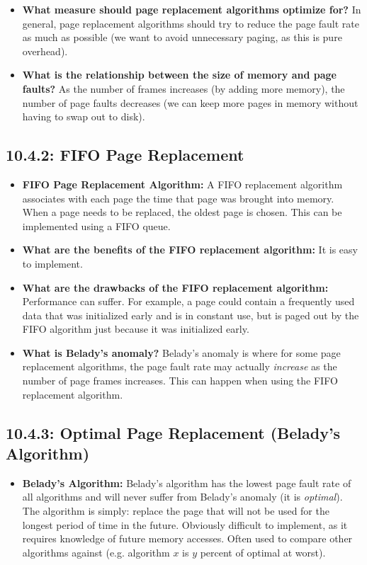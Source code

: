 \documentclass[12pt]{article}
\begin{document}
\begin{itemize}
    \item \textbf{What measure should page replacement algorithms optimize for?} In general, page replacement algorithms should try to reduce the page fault rate as much as possible (we want to avoid unnecessary paging, as this is pure overhead).
    \item \textbf{What is the relationship between the size of memory and page faults?} As the number of frames increases (by adding more memory), the number of page faults decreases (we can keep more pages in memory without having to swap out to disk).
\end{itemize}

\subsection*{10.4.2: FIFO Page Replacement}

\begin{itemize}
    \item \textbf{FIFO Page Replacement Algorithm:} A FIFO replacement algorithm associates with each page the time that page was brought into memory. When a page needs to be replaced, the oldest page is chosen. This can be implemented using a FIFO queue.
    \item \textbf{What are the benefits of the FIFO replacement algorithm:} It is easy to implement.
    \item \textbf{What are the drawbacks of the FIFO replacement algorithm:} Performance can suffer. For example, a page could contain a frequently used data that was initialized early and is in constant use, but is paged out by the FIFO algorithm just because it was initialized early.
    \item \textbf{What is Belady's anomaly?} Belady's anomaly is where for some page replacement algorithms, the page fault rate may actually \textit{increase} as the number of page frames increases. This can happen when using the FIFO replacement algorithm.
\end{itemize}

\subsection*{10.4.3: Optimal Page Replacement (Belady's Algorithm)}

\begin{itemize}
    \item \textbf{Belady's Algorithm:} Belady's algorithm has the lowest page fault rate of all algorithms and will never suffer from Belady's anomaly (it is \textit{optimal}). The algorithm is simply: replace the page that will not be used for the longest period of time in the future. Obviously difficult to implement, as it requires knowledge of future memory accesses. Often used to compare other algorithms against (e.g. algorithm \(x\) is \(y\) percent of optimal at worst).
\end{itemize}
\end{document}
